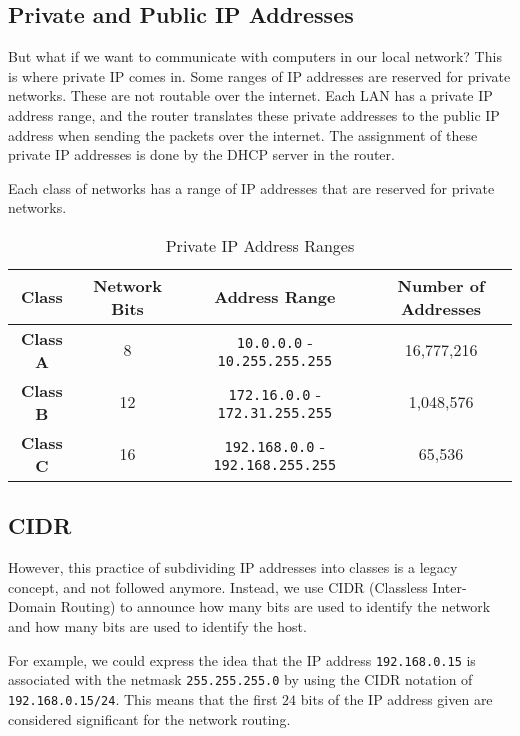 \subsection{Private and Public IP Addresses}

But what if we want to communicate with computers
in our local network? This is where private IP
comes in. Some ranges of IP addresses are reserved
for private networks. These are not routable over
the internet. Each LAN has a private IP address
range, and the router translates these private
addresses to the public IP address when sending
the packets over the internet. The assignment
of these private IP addresses is done by the
DHCP server
in the router.

Each class of networks has a range of IP addresses
that are reserved for private networks.

\begin{table*}[h!]
\caption{Private IP Address Ranges}
\begin{tabular}{c c c c}
\toprule
Class & Network Bits & Address Range & Number of Addresses \\
\midrule
\textbf{Class A} & 8 & \lstinline|10.0.0.0| - \lstinline|10.255.255.255| & 16,777,216 \\
\textbf{Class B} & 12 & \lstinline|172.16.0.0| - \lstinline|172.31.255.255| & 1,048,576 \\
\textbf{Class C} & 16 & \lstinline|192.168.0.0| - \lstinline|192.168.255.255| & 65,536 \\
\bottomrule
\end{tabular}
\end{table*}

\subsection{CIDR}

However, this practice of subdividing IP addresses
into classes is a legacy concept, and not followed
anymore. Instead, we use CIDR (Classless Inter-Domain
Routing) to announce how many bits are used to identify
the network and how many bits are used to identify the
host.

For example, we could express the idea that the IP address
\lstinline|192.168.0.15| is associated with the netmask
\lstinline|255.255.255.0| by using the CIDR notation of
\lstinline|192.168.0.15/24|. This means that the first
$24$ bits of the IP address given are considered
significant for the network routing.

